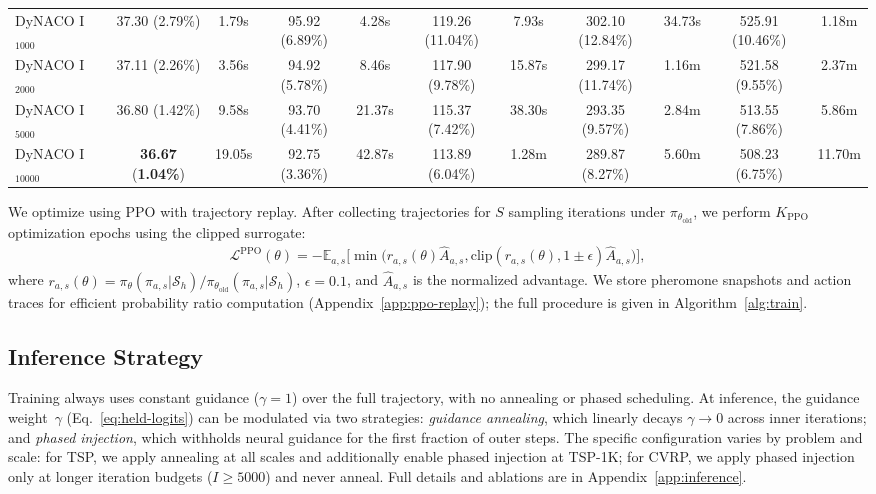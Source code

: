 \documentclass[sigconf]{acmart}
\begin{document}
\begin{table}[t]
{\begin{tabular}{lcccccccccc}
\midrule
DyNACO I$_{1000}$ & 37.30 (2.79\%) & 1.79s & 95.92 (6.89\%) & 4.28s & 119.26 (11.04\%) & 7.93s & 302.10 (12.84\%) & 34.73s & 525.91 (10.46\%) & 1.18m \\
DyNACO I$_{2000}$ & 37.11 (2.26\%) & 3.56s & 94.92 (5.78\%) & 8.46s & 117.90 (9.78\%) & 15.87s & 299.17 (11.74\%) & 1.16m & 521.58 (9.55\%) & 2.37m \\
DyNACO I$_{5000}$ & 36.80 (1.42\%) & 9.58s & 93.70 (4.41\%) & 21.37s & 115.37 (7.42\%) & 38.30s & 293.35 (9.57\%) & 2.84m & 513.55 (7.86\%) & 5.86m \\
DyNACO I$_{10000}$ & \textbf{36.67} (\textbf{1.04\%}) & 19.05s & 92.75 (3.36\%) & 42.87s & 113.89 (6.04\%) & 1.28m & 289.87 (8.27\%) & 5.60m & 508.23 (6.75\%) & 11.70m \\
\bottomrule
\end{tabular}
}
\end{table}

We optimize using PPO with trajectory replay.
After collecting trajectories for $S$ sampling iterations under $\pi_{\theta_{\text{old}}}$, we perform $K_{\text{PPO}}$ optimization epochs using the clipped surrogate:
\begin{multline}
\mathcal{L}^{\text{PPO}}(\theta) = -\mathbb{E}_{a,s}\Big[ \min\big( r_{a,s}(\theta) \hat{A}_{a,s}, 
\text{clip}(r_{a,s}(\theta), 1{\pm}\epsilon) \hat{A}_{a,s} \big) \Big],
\end{multline}
where $r_{a,s}(\theta) = \pi_\theta(\pi_{a,s} | \mathcal{S}_h) / \pi_{\theta_{\text{old}}}(\pi_{a,s} | \mathcal{S}_h)$, $\epsilon=0.1$, and $\hat{A}_{a,s}$ is the normalized advantage.
We store pheromone snapshots and action traces for efficient probability ratio computation (Appendix~\ref{app:ppo-replay}); the full procedure is given in Algorithm~\ref{alg:train}.



\subsection{Inference Strategy}
\label{sec:inference}
Training always uses constant guidance ($\gamma{=}1$) over the full trajectory, with no annealing or phased scheduling.
At inference, the guidance weight~$\gamma$ (Eq.~\ref{eq:held-logits}) can be modulated via two strategies: \emph{guidance annealing}, which linearly decays $\gamma \to 0$ across inner iterations; and \emph{phased injection}, which withholds neural guidance for the first fraction of outer steps.
The specific configuration varies by problem and scale: for TSP, we apply annealing at all scales and additionally enable phased injection at TSP-1K; for CVRP, we apply phased injection only at longer iteration budgets ($I{\geq}5000$) and never anneal.
Full details and ablations are in Appendix~\ref{app:inference}.
\end{document}
